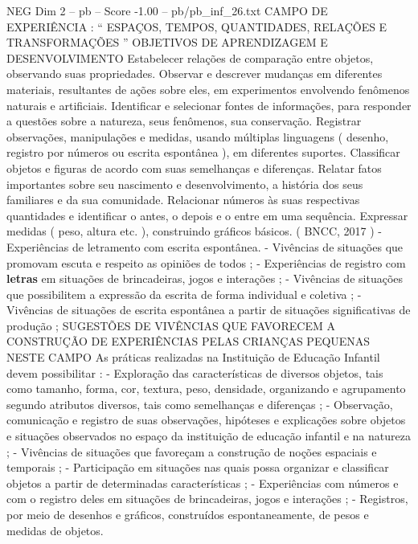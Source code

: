 \begin{textsample}{NEG Dim 2 – pb – Score -1.00 – pb/pb\_inf\_26.txt}  \label{ex:f2_neg_019}
CAMPO DE EXPERIÊNCIA : “ ESPAÇOS, TEMPOS, QUANTIDADES, RELAÇÕES E TRANSFORMAÇÕES ” OBJETIVOS DE APRENDIZAGEM E DESENVOLVIMENTO Estabelecer relações de comparação entre objetos, observando suas propriedades.
Observar e descrever mudanças em diferentes materiais, resultantes de ações sobre eles, em experimentos envolvendo fenômenos naturais e artificiais.
Identificar e selecionar fontes de informações, para responder a questões sobre a natureza, seus fenômenos, sua conservação.
Registrar observações, manipulações e medidas, usando múltiplas linguagens ( desenho, registro por números ou escrita espontânea ), em diferentes suportes.
Classificar objetos e figuras de acordo com suas semelhanças e diferenças.
Relatar fatos importantes sobre seu nascimento e desenvolvimento, a história dos seus familiares e da sua comunidade.
Relacionar números às suas respectivas quantidades e identificar o antes, o depois e o entre em uma sequência.
Expressar medidas ( peso, altura etc. ), construindo gráficos básicos. ( BNCC, 2017 ) - Experiências de letramento com escrita espontânea. - Vivências de situações que promovam escuta e respeito as opiniões de todos ; - Experiências de registro com \textbf{letras} em situações de brincadeiras, jogos e interações ; - Vivências de situações que possibilitem a expressão da escrita de forma individual e coletiva ; - Vivências de situações de escrita espontânea a partir de situações significativas de produção ; SUGESTÕES DE VIVÊNCIAS QUE FAVORECEM A CONSTRUÇÃO DE EXPERIÊNCIAS PELAS CRIANÇAS PEQUENAS NESTE CAMPO As práticas realizadas na Instituição de Educação Infantil devem possibilitar : - Exploração das características de diversos objetos, tais como tamanho, forma, cor, textura, peso, densidade, organizando e agrupamento segundo atributos diversos, tais como semelhanças e diferenças ; - Observação, comunicação e registro de suas observações, hipóteses e explicações sobre objetos e situações observados no espaço da instituição de educação infantil e na natureza ; - Vivências de situações que favoreçam a construção de noções espaciais e temporais ; - Participação em situações nas quais possa organizar e classificar objetos a partir de determinadas características ; - Experiências com números e com o registro deles em situações de brincadeiras, jogos e interações ; - Registros, por meio de desenhos e gráficos, construídos espontaneamente, de pesos e medidas de objetos.

\end{textsample}
